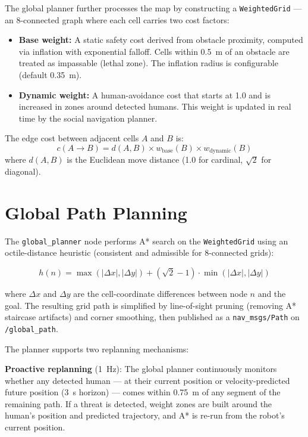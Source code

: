 \documentclass[a4paper]{article}
\begin{document}
The global planner further processes the map by constructing a \texttt{WeightedGrid} --- an 8-connected graph where each cell carries two cost factors:

\begin{itemize}
    \item \textbf{Base weight:} A static safety cost derived from obstacle proximity, computed via inflation with exponential falloff. Cells within 0.5~m of an obstacle are treated as impassable (lethal zone). The inflation radius is configurable (default 0.35~m).
    \item \textbf{Dynamic weight:} A human-avoidance cost that starts at 1.0 and is increased in zones around detected humans. This weight is updated in real time by the social navigation planner.
\end{itemize}

The edge cost between adjacent cells $A$ and $B$ is:
\begin{equation}
    c(A \to B) = d(A,B) \times w_{\text{base}}(B) \times w_{\text{dynamic}}(B)
\end{equation}
where $d(A,B)$ is the Euclidean move distance (1.0 for cardinal, $\sqrt{2}$ for diagonal).


\section{Global Path Planning}

The \texttt{global\_planner} node performs A* search on the \texttt{WeightedGrid} using an octile-distance heuristic (consistent and admissible for 8-connected grids):

\begin{equation}
    h(n) = \max(|\Delta x|, |\Delta y|) + (\sqrt{2} - 1) \cdot \min(|\Delta x|, |\Delta y|)
\end{equation}

where $\Delta x$ and $\Delta y$ are the cell-coordinate differences between node $n$ and the goal. The resulting grid path is simplified by line-of-sight pruning (removing A* staircase artifacts) and corner smoothing, then published as a \texttt{nav\_msgs/Path} on \texttt{/global\_path}.

The planner supports two replanning mechanisms:

\textbf{Proactive replanning} (1~Hz): The global planner continuously monitors whether any detected human --- at their current position or velocity-predicted future position (3~s horizon) --- comes within 0.75~m of any segment of the remaining path. If a threat is detected, weight zones are built around the human's position and predicted trajectory, and A* is re-run from the robot's current position.
\end{document}

